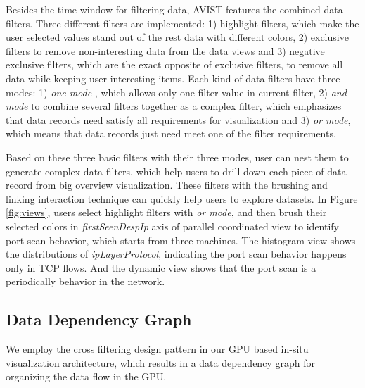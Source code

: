 \documentclass[journal]{vgtc}                %
\begin{document}
{Besides the time window for filtering data, AVIST features the combined data filters. Three different filters are implemented: 1) highlight filters, which make the user selected values stand out of the rest data with different colors,  2) exclusive filters to remove non-interesting data from the data views and 3) negative exclusive filters, which are the exact opposite of exclusive filters, to remove all data while keeping user interesting items. Each kind of data filters have three  modes: 1) \emph{one mode} , which allows only one filter value in current filter, 2) \emph{and mode}  to combine several filters together as a complex filter, which emphasizes that data records need satisfy all requirements for visualization and 3) \emph{or mode}, which means that data records just need meet one of the filter requirements. 



Based on these three basic filters with their three modes, user can nest them to generate complex data filters, which help users to drill down each piece of data record from big overview visualization. These filters with the brushing and linking interaction technique can quickly help users to explore datasets. In Figure \ref{fig:views}, users select  highlight filters with \emph{or mode}, and then brush their selected colors in \textit{firstSeenDespIp} axis of parallel coordinated view to identify port scan behavior, which starts from three machines. The histogram view shows the distributions of \textit{ipLayerProtocol}, indicating the port scan behavior happens only in TCP flows. And the dynamic view shows that the port scan is a periodically behavior in the network. 


\subsection{Data Dependency Graph}

We employ the cross filtering design pattern \cite{weaver2010cross} in our GPU based in-situ visualization architecture, which results in a data dependency graph for organizing the data flow in the GPU.

}
\end{document}
